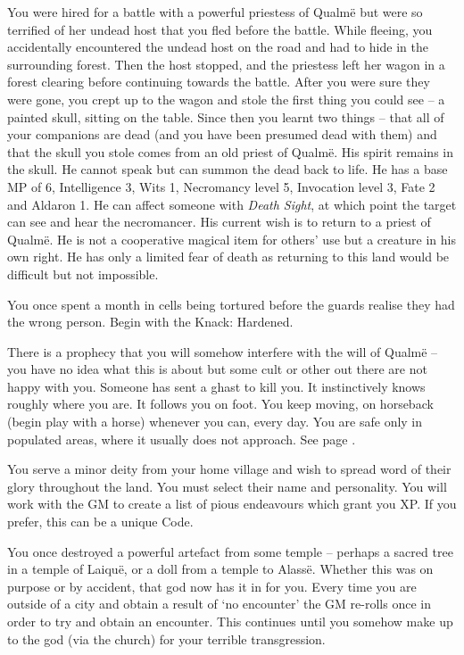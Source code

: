 \begin{multicols}{2}
\begin{list}{\addtocounter{list}{1}\textbf{:}}{\raggedleft}
  \item
  You were hired for a battle with a powerful priestess of Qualm\"{e} but were so terrified of her undead host that you fled before the battle.
  While fleeing, you accidentally encountered the undead host on the road and had to hide in the surrounding forest.
  Then the host stopped, and the priestess left her wagon in a forest clearing before continuing towards the battle.
  After you were sure they were gone, you crept up to the wagon and stole the first thing you could see -- a painted skull, sitting on the table.
  Since then you learnt two things -- that all of your companions are dead (and you have been presumed dead with them) and that the skull you stole comes from an old priest of Qualm\"{e}.
  His spirit remains in the skull.
  He cannot speak but can summon the dead back to life.
  He has a base MP of 6, Intelligence 3, Wits 1, Necromancy level 5, Invocation level 3, Fate 2 and Aldaron 1.
  He can affect someone with \textit{Death Sight}, at which point the target can see and hear the necromancer.
  His current wish is to return to a priest of Qualm\"{e}.
  He is not a cooperative magical item for others' use but a creature in his own right.
  He has only a limited fear of death as returning to this land would be difficult but not impossible.

  \item
  You once spent a month in cells being tortured before the guards realise they had the wrong person.
  Begin with the Knack: Hardened.

  \item
  There is a prophecy that you will somehow interfere with the will of Qualm\"{e} -- you have no idea what this is about but some cult or other out there are not happy with you.
  Someone has sent a ghast to kill you.
  It instinctively knows roughly where you are.
  It follows you on foot.
  You keep moving, on horseback (begin play with a horse) whenever you can, every day.
  You are safe only in populated areas, where it usually does not approach.
  See page \pageref{ghast}.

  \item
  You serve a minor deity from your home village and wish to spread word of their glory throughout the land.
  You must select their name and personality.
  You will work with the GM to create a list of pious endeavours which grant you XP.
  If you prefer, this can be a unique Code.

  \item
  You once destroyed a powerful artefact from some temple -- perhaps a sacred tree in a temple of Laiqu\"{e}, or a doll from a temple to Alass\"e.
  Whether this was on purpose or by accident, that god now has it in for you.  Every time you are outside of a city and obtain a result of `no encounter' the GM re-rolls once in order to try and obtain an encounter.
  This continues until you somehow make up to the god (via the church) for your terrible transgression.


\end{list}
\end{multicols}
